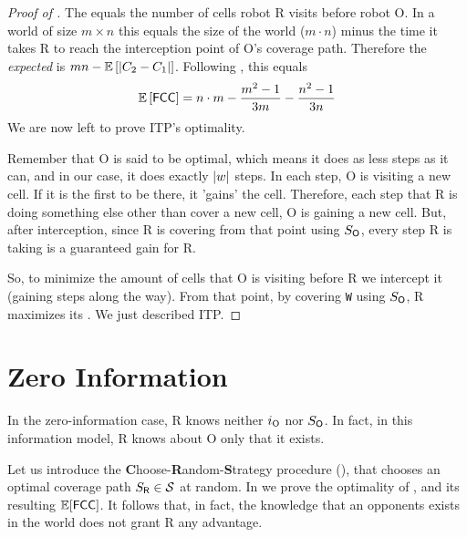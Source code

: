 \documentclass[letterpaper, 10 pt, conference]{ieeeconf}  %
\theoremstyle{definition}
\newcommand{\rob}{{{\sf R}}\xspace}
\newcommand{\opp}{{{\sf O}}\xspace}
\newcommand{\w}{{{\texttt W}}\xspace}
\newcommand{\fcc}{{{\sf{FCC}}}\xspace}
\newcommand{\itp}{{{\textsf{ITP}}}\xspace}
\newcommand{\crs}{{{\sf{CRS}}}\xspace}
\DeclarePairedDelimiter\abs{\lvert}{\rvert}%
\begin{document}
\begin{proof} [Proof of ]
The \fcc equals the number of cells robot \rob visits before robot \opp. In a world of size $m \times n$ this equals the size of the world ($m\cdot n$) minus the time it takes \rob to reach the interception point of \opp's coverage path. Therefore the {\em expected} \fcc is $mn - \mathbb{E}\left[\abs*{C_2-C_1}\right]$. Following , this equals 
\[\mathbb{E}\left[\fcc\right]=%
n\cdot m - \frac{m^2-1}{3m} - \frac{n^2-1}{3n}\]
We are now left to prove \itp's optimality.

Remember that \opp is said to be optimal, which means it does as less steps as it can, and in our case, it does exactly $\abs*{w}$ steps.
In each step, \opp is visiting a new cell.
If it is the first to be there, it 'gains' the cell. 
Therefore, each step that \rob is doing something else other than cover a new cell, \opp is gaining a new cell. But, after interception, since \rob is covering from that point using $S_\opp$, every step \rob is taking is a guaranteed gain for \rob.

So, to minimize the amount of cells that \opp is visiting before \rob we intercept it (gaining steps along the way). From that point, by covering \w using $S_\opp$, \rob maximizes its \fcc. We just described \itp.
\end{proof}

\section{Zero Information}
In the zero-information case, \rob knows neither $i_\opp$ nor $S_\opp$. In fact, in this information model, \rob knows about \opp only that it exists.

Let us introduce the \textbf{C}hoose-\textbf{R}andom-\textbf{S}trategy procedure (\crs), that chooses an optimal coverage path $S_\rob\in\mathcal{S}$ at random. In  we prove the optimality of \crs, and its resulting $\mathbb{E}[\fcc]$. It follows that, in fact, the knowledge that an opponents exists in the world does not grant \rob any advantage.
\end{document}

